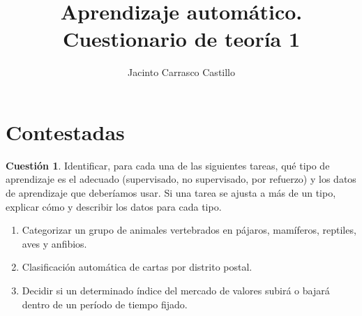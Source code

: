 \documentclass[11pt,leqno]{article}
\title{Aprendizaje autom\'atico. Cuestionario de teor\'ia 1}
\author{Jacinto Carrasco Castillo}
\theoremstyle{definition}
\begin{document}
\maketitle

\newtheorem{cuestion}{Cuestión}
\newtheorem{solucion}{Solución}

\section{Contestadas}

\begin{cuestion}
Identificar, para cada una de las siguientes tareas, qué tipo de aprendizaje es el adecuado (supervisado, no supervisado, por refuerzo) y los datos de aprendizaje que deberíamos usar. Si una tarea se ajusta a más de un tipo, explicar cómo y describir los datos para cada tipo.

\begin{enumerate}[a]
\item Categorizar un grupo de animales vertebrados en pájaros, mamíferos, reptiles, aves y anfibios.
\item Clasificación automática de cartas por distrito postal.
\item Decidir si un determinado índice del mercado de valores subirá o bajará dentro de un período de tiempo fijado.
\end{enumerate}
\end{cuestion}
\end{document}

